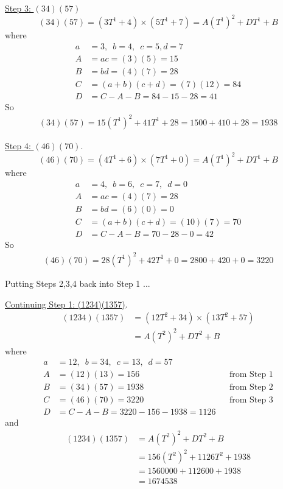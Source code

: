 \underline{Step 3: $(34)(57)$}
\[
(34)(57) = (3T^1 + 4) \times (5T^1 + 7) =  A(T^1)^2 + DT^1 + B 
\]
where
\begin{align*}
a &= 3, \,\,\, b = 4, \,\,\, c = 5, d = 7 \\
A &= a c = (3)(5) = 15\\
B &= b d = (4)(7) = 28\\
C &= (a + b) (c + d) = (7)(12) = 84\\
D &= C - A - B = 84 - 15 - 28 = 41
\end{align*}
So
\begin{align*}
(34)(57) = 15(T^1)^2 + 41T^1 + 28 = 1500 + 410 + 28 = 1938 
\end{align*}

\underline{Step 4: $(46)(70)$}.
\[
(46)(70) 
= (4T^1 + 6) \times (7T^1 + 0) = A(T^1)^2 + DT^1 + B 
\]
where
\begin{align*}
a &= 4, \,\,\, b = 6, \,\,\, c = 7, \,\,\, d = 0 \\
A &= a c = (4)(7) = 28\\
B &= b d = (6)(0) = 0\\
C &= (a + b) (c + d) = (10)(7) = 70\\
D &= C - A - B = 70 - 28 - 0 = 42
\end{align*}
So
\begin{align*}
(46)(70) = 28(T^1)^2 + 42T^1 + 0 = 2800 + 420 + 0 = 3220 
\end{align*}

Putting Steps 2,3,4 back into Step 1 ...

\underline{Continuing Step 1: (1234)(1357)}.
\begin{align*}
(1234)(1357)
&= (12T^2 + 34) \times (13T^2 + 57) \\
&= A (T^2)^2 + D T^2 + B
\end{align*}
where
\begin{align*}
a &= 12, \,\,\, b = 34, \,\,\, c = 13, \,\,\, d = 57 \\
A &= (12)(13) = 156    & & \text{from Step 1}\\
B &= (34)(57) = 1938   & & \text{from Step 2} \\
C &= (46)(70) = 3220   & & \text{from Step 3} \\
D &= C - A - B = 3220 - 156 - 1938 = 1126
\end{align*}
and
\begin{align*}
(1234)(1357)  
&= A(T^2)^2 + D T^2 + B \\
&= 156(T^2)^2 + 1126 T^2 + 1938 \\
&= 1560000 + 112600 + 1938 \\
&= 1674538
\end{align*}

